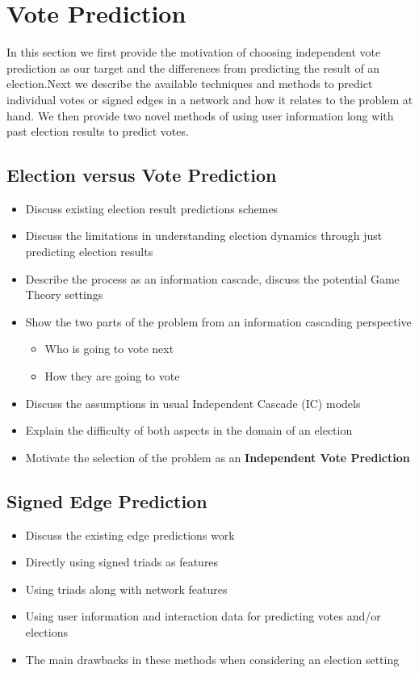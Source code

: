 \chapter{Vote Prediction}
In this section we first provide the motivation of choosing independent vote prediction as our target and the differences from predicting the result of an election.Next we describe the available techniques and methods to predict individual votes or signed edges in a network and how it relates to the problem at hand. We then provide two novel methods of using user information long with past election results to predict votes.

\section{Election versus Vote Prediction}
\begin{itemize}
    \item Discuss existing election result predictions schemes
    \item Discuss the limitations in understanding election dynamics through just predicting election results
    \item Describe the process as an information cascade, discuss the potential Game Theory settings
    \item Show the two parts of the problem from an information cascading perspective 
     \begin{itemize}
        \item Who is going to vote next
        \item How they are going to vote
    \end{itemize}
    \item Discuss the assumptions in usual Independent Cascade (IC) models
    \item Explain the difficulty of both aspects in the domain of an election 
    \item Motivate the selection of the problem as an \textbf{Independent Vote Prediction}
\end{itemize}
\section{Signed Edge Prediction}
\begin{itemize}
    \item Discuss the existing edge predictions work
    \item Directly using signed triads as features
    \item Using triads along with network features
    \item Using user information and interaction data for predicting votes and/or elections
    \item The main drawbacks in these methods when considering an election setting
\end{itemize}
